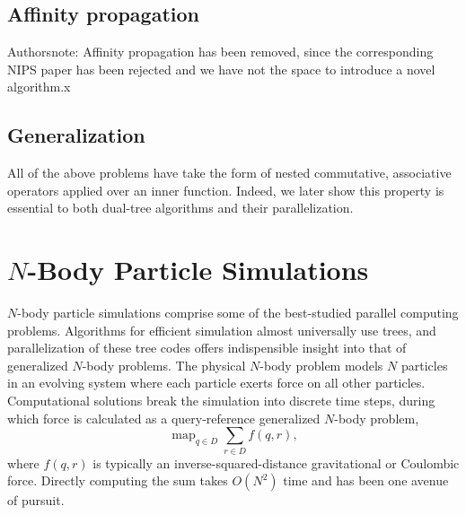 \documentclass[twoside,leqno,twocolumn]{article}
\DeclareMathOperator*{\map}{map}
\DeclareMathOperator*{\argmin}{argmin}
\newcommand{\mysub}[1]{\subsection{#1} }
\newcommand{\ocpos}[1]{c^{+}_{#1}}
\newcommand{\cpos}[2]{\ocpos{#1 \neq #2}}
\newcommand{\simil}[2]{S_{#1#2}}
\newcommand{\vecrho}{\vec{\rho}}
\newcommand{\vecalpha}{\vec{\alpha}}
\newcommand{\frho}[1]{\rho_{#1}}
\newcommand{\falpha}[1]{\alpha_{#1}}
\newcommand{\falphaj}[2]{\alpha_{#1[#2]}}
\begin{document}
\mysub{Affinity propagation}
Authorsnote: Affinity propagation has been removed, since the corresponding NIPS paper has been rejected and we have not the space to introduce a novel algorithm.x

\mysub{Generalization}
All of the above problems have take the form of nested commutative, associative operators applied over an inner function.
Indeed, we later show this property is essential to both dual-tree algorithms and their parallelization.

\section{$N$-Body Particle Simulations}

$N$-body particle simulations comprise some of the best-studied parallel computing problems.
Algorithms for efficient simulation almost universally use trees, and parallelization of these tree codes offers indispensible insight into that of generalized $N$-body problems.
The physical $N$-body problem models $N$ particles in an evolving system where each particle exerts force on all other particles.
Computational solutions break the simulation into discrete time steps, during which force is calculated as a query-reference generalized $N$-body problem,
\[\map_{q \in D} \sum_{r \in D} f(q,r),\]
\noindent where $f(q,r)$ is typically an inverse-squared-distance gravitational or Coulombic force.
Directly computing the sum takes $O(N^2)$ time and has been one avenue of pursuit\cite{grape}.
\end{document}
